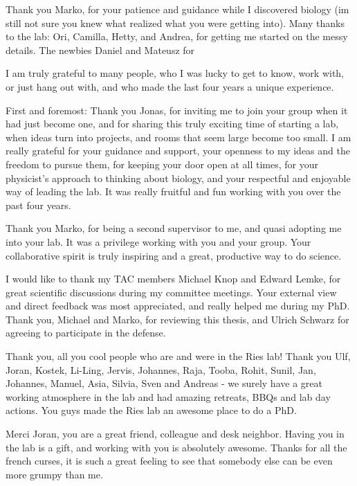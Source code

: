 \documentclass[
12pt, %
ngerman,
english, %
onehalfspacing,
hidelinks,
toctotoc, %
headsepline, %
]{MastersDoctoralThesis} %
\begin{document}
\begin{acknowledgements}
\addchaptertocentry{\acknowledgementname} %

Thank you Marko, for your patience and guidance while I discovered biology (im still not sure you knew what realized what you were getting into). Many thanks to the lab: Ori, Camilla, Hetty, and Andrea, for getting me started on the messy details. The newbies Daniel and Mateusz for 

I am truly grateful to many people, who I was lucky to get to know, work with, or just hang out with, and who made the last four years a unique experience.

First and foremost: Thank you Jonas, for inviting me to join your group when it had just become one, and for sharing this truly exciting time of starting a lab, when ideas turn into projects, and rooms that seem large become too small. I am really grateful for your guidance and support, your openness to my ideas and the freedom to pursue them, for keeping your door open at all times, for your physicist's approach to thinking about biology, and your respectful and enjoyable way of leading the lab. It was really fruitful and fun working with you over the past four years. 

Thank you Marko, for being a second supervisor to me, and quasi adopting me into your lab. It was a privilege working with you and your group. Your collaborative spirit is truly inspiring and a great, productive way to do science. 

I would like to thank my TAC members Michael Knop and Edward Lemke, for great scientific discussions during my committee meetings. Your external view and direct feedback was most appreciated, and really helped me during my PhD. Thank you, Michael and Marko, for reviewing this thesis, and Ulrich Schwarz for agreeing to participate in the defense.

Thank you, all you cool people who are and were in the Ries lab! Thank you Ulf, Joran, Kostek, Li-Ling, Jervis, Johannes, Raja, Tooba, Rohit, Sunil, Jan, Johannes, Manuel, Asia, Silvia, Sven and Andreas - we surely have a great working atmosphere in the lab and had amazing retreats, BBQs and lab day actions. You guys made the Ries lab an awesome place to do a PhD.

Merci Joran, you are a great friend, colleague and desk neighbor. Having you in the lab is a gift, and working with you is absolutely awesome. Thanks for all the french curses, it is such a great feeling to see that somebody else can be even more grumpy than me.


\end{acknowledgements}
\end{document}
